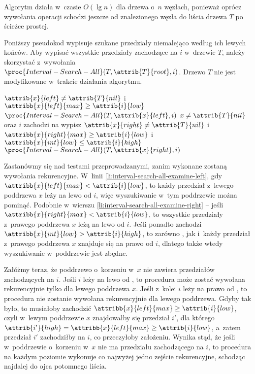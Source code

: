 Algorytm działa w~czasie $O(\lg n)$ dla drzewa o~$n$ węzłach, ponieważ oprócz wywołania operacji  schodzi jeszcze od znalezionego węzła do liścia drzewa $T$ po ścieżce prostej.

\exercise %

\noindent Poniższy pseudokod wypisuje szukane przedziały niemalejąco według ich lewych końców.
Aby wypisać wszystkie przedziały zachodzące na $i$ w~drzewie $T$, należy skorzystać z~wywołania $\proc{Interval-Search-All}(T,\attrib{T}{root},i)$.
Drzewo $T$ nie jest modyfikowane w~trakcie działania algorytmu.
\begin{codebox}
\li	\If $\attrib{x}{left}\ne\attrib{T}{nil}$ i~$\attribb{x}{left}{max}\ge\attrib{i}{low}$ \label{li:interval-search-all-examine-left}
\li		\Then $\proc{Interval-Search-All}(T,\attrib{x}{left},i)$
		\End
\li \If $x\ne\attrib{T}{nil}$ oraz $i$ zachodzi na 
\li		\Then wypisz 
		\End
\li	\If $\attrib{x}{right}\ne\attrib{T}{nil}$ i~$\attribb{x}{right}{max}\ge\attrib{i}{low}$ i~$\attribb{x}{int}{low}\le\attrib{i}{high}$ \label{li:interval-search-all-examine-right}
\li		\Then $\proc{Interval-Search-All}(T,\attrib{x}{right},i)$
		\End
\end{codebox}

Zastanówmy się nad testami przeprowadzanymi, zanim wykonane zostaną wywołania rekurencyjne.
W~linii \ref{li:interval-search-all-examine-left}, gdy $\attribb{x}{left}{max}<\attrib{i}{low}$, to każdy przedział z~lewego poddrzewa $x$ leży na lewo od $i$, więc wyszukiwanie w~tym poddrzewie można pominąć.
Podobnie w~wierszu \ref{li:interval-search-all-examine-right} -- jeśli $\attribb{x}{right}{max}<\attrib{i}{low}$, to wszystkie przedziały z~prawego poddrzewa $x$ leżą na lewo od $i$.
Jeśli ponadto zachodzi $\attribb{x}{int}{low}>\attrib{i}{high}$, to zarówno , jak i~każdy przedział z~prawego poddrzewa $x$ znajduje się na prawo od $i$, dlatego także wtedy wyszukiwanie w~poddrzewie jest zbędne.

Załóżmy teraz, że poddrzewo o~korzeniu w~$x$ nie zawiera przedziałów zachodzących na $i$.
Jeśli $i$ leży na lewo od , to procedura może zostać wywołana rekurencyjnie tylko dla lewego poddrzewa $x$.
Jeśli z~kolei $i$ leży na prawo od , to procedura nie zostanie wywołana rekurencyjnie dla lewego poddrzewa.
Gdyby tak było, to musiałoby zachodzić $\attribb{x}{left}{max}\ge\attrib{i}{low}$, czyli w~lewym poddrzewie $x$ znajdowałby się przedział $i'$, dla którego $\attrib{i'}{high}=\attribb{x}{left}{max}\ge\attrib{i}{low}$, a~zatem przedział $i'$ zachodziłby na $i$, co przeczyłoby założeniu.
Wynika stąd, że jeśli w~poddrzewie o~korzeniu w~$x$ nie ma przedziału zachodzącego na $i$, to procedura na każdym poziomie wykonuje co najwyżej jedno zejście rekurencyjne, schodząc najdalej do ojca potomnego liścia.

